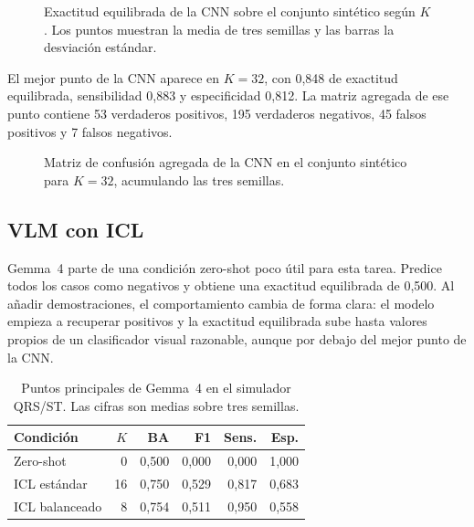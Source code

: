 \begin{figure}[H]
  \centering
  \caption{Exactitud equilibrada de la CNN sobre el conjunto sintético según \(K\). Los puntos muestran la media de tres semillas y las barras la desviación estándar.}
  \label{fig:cnn_simulator_ba}
\end{figure}

El mejor punto de la CNN aparece en \(K=32\), con 0,848 de exactitud equilibrada, sensibilidad 0,883 y especificidad 0,812. La matriz agregada de ese punto contiene 53 verdaderos positivos, 195 verdaderos negativos, 45 falsos positivos y 7 falsos negativos.

\begin{figure}[H]
  \centering
  \caption{Matriz de confusión agregada de la CNN en el conjunto sintético para \(K=32\), acumulando las tres semillas.}
  \label{fig:cnn_simulator_confusion}
\end{figure}

\subsection{VLM con ICL}

Gemma~4 parte de una condición zero-shot poco útil para esta tarea. Predice todos los casos como negativos y obtiene una exactitud equilibrada de 0,500. Al añadir demostraciones, el comportamiento cambia de forma clara: el modelo empieza a recuperar positivos y la exactitud equilibrada sube hasta valores propios de un clasificador visual razonable, aunque por debajo del mejor punto de la CNN.

\begin{table}[H]
  \centering
  \small
  \begin{tabularx}{0.94\textwidth}{p{3.6cm}rrrrr}
    \toprule
    Condición & \(K\) & BA & F1 & Sens. & Esp. \\
    \midrule
    Zero-shot & 0  & 0,500 & 0,000 & 0,000 & 1,000 \\
    ICL estándar & 16 & 0,750 & 0,529 & 0,817 & 0,683 \\
    ICL balanceado & 8  & 0,754 & 0,511 & 0,950 & 0,558 \\
    \bottomrule
  \end{tabularx}
  \caption{Puntos principales de Gemma~4 en el simulador QRS/ST. Las cifras son medias sobre tres semillas.}
  \label{tab:vlm_simulador_key}
\end{table}

